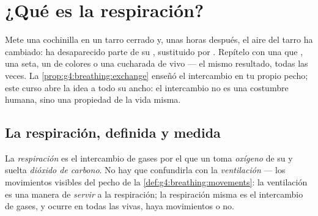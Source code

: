 \chapter{¿Qué es la respiración?}\label{ch:g7:what-is-respiration}

Mete una cochinilla en un tarro cerrado y, unas horas después, el aire
del tarro ha cambiado: ha desaparecido parte de su , sustituido
por . Repítelo con una  que , una seta,
un  de colores o una cucharada de  vivo --- el mismo resultado,
todas las veces. La \cref{prop:g4:breathing:exchange} enseñó el
intercambio en tu propio pecho; este curso abre la idea a todo su
ancho: el intercambio no es una costumbre humana, sino una propiedad de
la vida misma.

\section{La respiración, definida y medida}

\begin{definition}[Respiración]\label{def:g7:what-is-respiration:respiration}
La \emph{respiración} es el intercambio de gases por
el que un  toma \emph{oxígeno} de su  y
suelta \emph{dióxido de carbono}. No hay que
confundirla con la \emph{ventilación} --- los
movimientos visibles del pecho de la
\cref{def:g4:breathing:movements}: la ventilación es una manera de
\emph{servir} a la respiración; la respiración misma es el intercambio
de gases, y ocurre en todas las  vivas, haya movimientos o no.
\end{definition}

